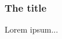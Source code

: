 \documentclass{beamer}
\begin{document}
\begin{frame}
    \frametitle{The title}
    Lorem ipsum...
\end{frame}
\end{document}
